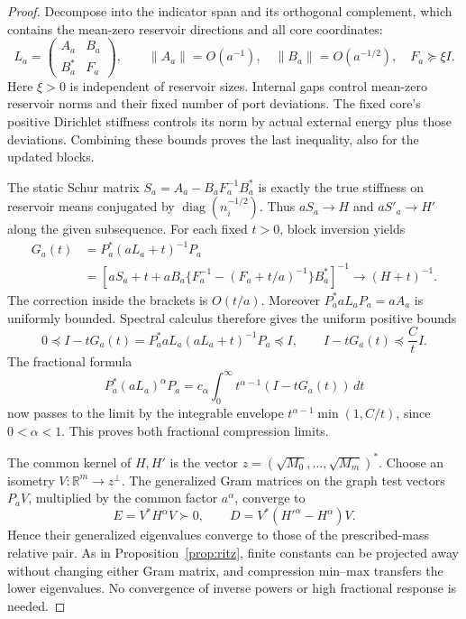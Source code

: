 \documentclass[11pt]{article}
\newcommand{\diag}{\operatorname{diag}}
\newcommand{\R}{\mathbb R}
\begin{document}
\begin{proof}
Decompose into the indicator span and its orthogonal complement, which
contains the mean-zero reservoir directions and all core coordinates:
\[
 L_a=\begin{pmatrix}A_a&B_a\\B_a^*&F_a\end{pmatrix},\qquad
 \|A_a\|=O(a^{-1}),\quad\|B_a\|=O(a^{-1/2}),\quad F_a\succeq\xi I.
\]
Here $\xi>0$ is independent of reservoir sizes. Internal gaps control
mean-zero reservoir norms and their fixed number of port deviations.
The fixed core's positive Dirichlet stiffness controls its norm by
actual external energy plus those deviations. Combining these bounds
proves the last inequality, also for the updated blocks.

The static Schur matrix $S_a=A_a-B_aF_a^{-1}B_a^*$ is exactly the true
stiffness on reservoir means conjugated by $\diag(n_i^{-1/2})$.
Thus $aS_a\to H$ and $aS'_a\to H'$ along the given subsequence.
For each fixed $t>0$, block inversion yields
\begin{align*}
 G_a(t)&=P_a^*(aL_a+t)^{-1}P_a\\
 &=\left[aS_a+t+
   aB_a\{F_a^{-1}-(F_a+t/a)^{-1}\}B_a^*\right]^{-1}
       \longrightarrow(H+t)^{-1}.
\end{align*}
The correction inside the brackets is $O(t/a)$. Moreover
$P_a^*aL_aP_a=aA_a$ is uniformly bounded. Spectral calculus therefore
gives the uniform positive bounds
\[
 0\preceq I-tG_a(t)
   =P_a^*aL_a(aL_a+t)^{-1}P_a
   \preceq I,\qquad
 I-tG_a(t)\preceq \frac Ct I.
\]
The fractional formula
\[
 P_a^*(aL_a)^\alpha P_a
       =c_\alpha\int_0^\infty t^{\alpha-1}(I-tG_a(t))\,dt
\]
now passes to the limit by the integrable envelope
$t^{\alpha-1}\min(1,C/t)$, since $0<\alpha<1$. This proves both
fractional compression limits.

The common kernel of $H,H'$ is the vector
$z=(\sqrt{M_0},\ldots,\sqrt{M_m})^*$.
Choose an isometry $V:\R^m\to z^\perp$. The generalized Gram matrices
on the graph test vectors $P_aV$, multiplied by the common factor
$a^\alpha$, converge to
\[
 E=V^*H^\alpha V\succ0,\qquad
 D=V^*({H'}^\alpha-H^\alpha)V.
\]
Hence their generalized eigenvalues converge to those of the
prescribed-mass relative pair. As in Proposition~\ref{prop:ritz},
finite constants can be projected away without changing either Gram
matrix, and compression min--max transfers the lower eigenvalues.
No convergence of inverse powers or high fractional response is needed.
\end{proof}
\end{document}
